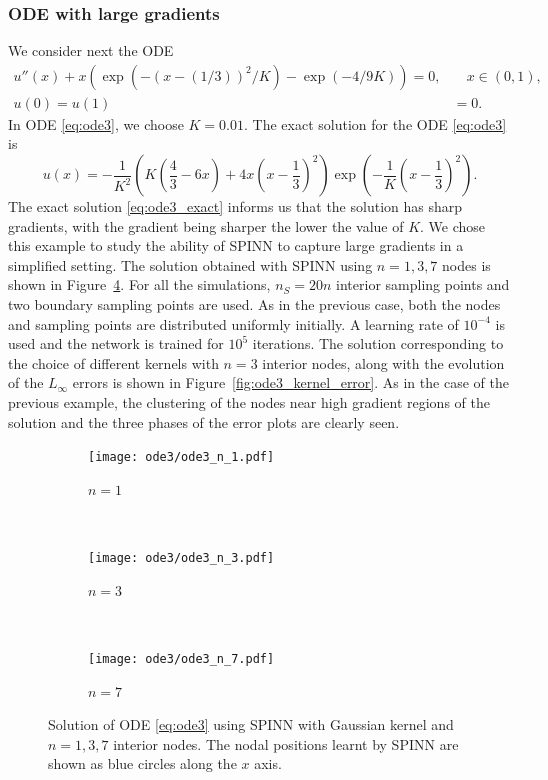 \documentclass[12pt]{article}
\newcommand{\rr}[1]{#1}
\newcommand{\rb}[1]{#1}
\newcommand{\new}[1]{#1}
\begin{document}
\subsubsection{ODE with large gradients}
\new{We consider next the ODE
\begin{equation} \label{eq:ode3}
\begin{split}
u''(x) + x(\exp (-(x - (1/3))^2/K) - \exp (-4/9K)) = 0, &\quad x\in (0,1),\\
u(0) = u(1) &= 0.
\end{split}
\end{equation}
In ODE \eqref{eq:ode3}, we choose $K = 0.01$.  The exact solution for the ODE \eqref{eq:ode3} is
\begin{equation} \label{eq:ode3_exact}
u(x) = -\frac{1}{K^2}\left(K \left(\frac{4}{3} - 6x\right) + 4x\left(x - \frac{1}{3}\right)^2\right)\exp\left(-\frac{1}{K}\left(x - \frac{1}{3}\right)^2\right).
\end{equation}
The exact solution \eqref{eq:ode3_exact} informs us that the solution has sharp gradients, with the gradient being sharper the lower the value of $K$. We chose this example to study the ability of SPINN to capture large gradients in a simplified setting. The solution obtained with SPINN using $n=1,3,7$ nodes is shown in Figure~\ref{fig:spinn_ode_3}.} \rb{For all the simulations, $n_S = 20n$ interior sampling points and two boundary sampling points are used. As in the previous case, both the nodes and sampling points are distributed uniformly initially. A learning rate of $10^{-4}$ is used and the network is trained for $10^5$ iterations.} \rr{The solution corresponding to the choice of different kernels with $n = 3$ interior nodes, along with the evolution of the $L_\infty$ errors is shown in Figure~\ref{fig:ode3_kernel_error}.} \new{As in the case of the previous example, the clustering of the nodes near high gradient regions of the solution and the three phases of the error plots are clearly seen.}

\begin{figure}
\centering
\begin{subfigure}{0.3\textwidth}
\texttt{[image: ode3/ode3\_n\_1.pdf]}
\caption{$n = 1$}
\label{fig:ode3_n_1}
\end{subfigure}
~
\begin{subfigure}{0.3\textwidth}
\texttt{[image: ode3/ode3\_n\_3.pdf]}
\caption{$n = 3$}
\label{fig:ode3_n_3}
\end{subfigure}
~
\begin{subfigure}{0.3\textwidth}
\texttt{[image: ode3/ode3\_n\_7.pdf]}
\caption{$n = 7$}
\label{fig:ode3_n_7}
\end{subfigure}
\caption{Solution of ODE \eqref{eq:ode3} using SPINN with Gaussian kernel and $n=1,3,7$ interior nodes. The nodal positions learnt by SPINN are shown as blue circles along the $x$ axis.}
\label{fig:spinn_ode_3}
\end{figure}
\end{document}
